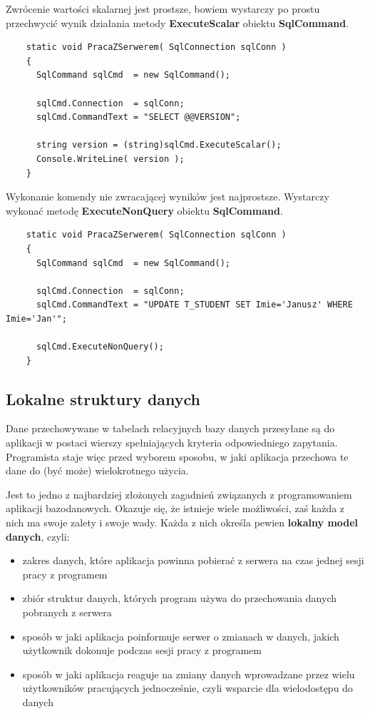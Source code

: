 Zwrócenie wartości skalarnej jest prostsze, bowiem wystarczy po prostu przechwycić wynik
działania metody {\bf ExecuteScalar} obiektu {\bf SqlCommand}.

\begin{scriptsize}
\begin{verbatim}
    static void PracaZSerwerem( SqlConnection sqlConn )
    {
      SqlCommand sqlCmd  = new SqlCommand();

      sqlCmd.Connection  = sqlConn;
      sqlCmd.CommandText = "SELECT @@VERSION";

      string version = (string)sqlCmd.ExecuteScalar();
      Console.WriteLine( version );
    }
\end{verbatim}
\end{scriptsize}

Wykonanie komendy nie zwracającej wyników jest najprostsze. Wystarczy wykonać metodę
{\bf ExecuteNonQuery} obiektu {\bf SqlCommand}.

\begin{scriptsize}
\begin{verbatim}
    static void PracaZSerwerem( SqlConnection sqlConn )
    {
      SqlCommand sqlCmd  = new SqlCommand();

      sqlCmd.Connection  = sqlConn;
      sqlCmd.CommandText = "UPDATE T_STUDENT SET Imie='Janusz' WHERE Imie='Jan'";

      sqlCmd.ExecuteNonQuery();
    }
\end{verbatim}
\end{scriptsize}

\subsection{Lokalne struktury danych}

Dane przechowywane w tabelach relacyjnych bazy danych przesyłane są
do aplikacji w postaci wierszy spełniających kryteria odpowiedniego zapytania. Programista staje więc
przed wyborem sposobu, w jaki aplikacja przechowa te dane do (być może) wielokrotnego użycia.

Jest to jedno z najbardziej złożonych zagadnień związanych z programowaniem aplikacji bazodanowych.
Okazuje się, że istnieje wiele możliwości, zaś każda z nich ma swoje zalety i swoje wady. Każda z nich
określa pewien {\bf lokalny model danych}, czyli:
\begin{itemize}
\item zakres danych, które aplikacja powinna pobierać z serwera na czas jednej sesji pracy z programem
\item zbiór struktur danych, których program używa do przechowania danych pobranych z serwera
\item sposób w jaki aplikacja poinformuje serwer o zmianach w danych, jakich użytkownik dokonuje podczas sesji
pracy z programem
\item sposób w jaki aplikacja reaguje na zmiany danych wprowadzane przez wielu użytkowników pracujących
jednocześnie, czyli wsparcie dla wielodostępu do danych
\end{itemize}

